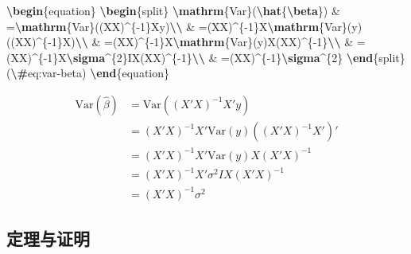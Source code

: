 \documentclass[
  12pt,
]{krantz}
\newenvironment{Shaded}{\begin{snugshade}}{\end{snugshade}}
\newcommand{\ExtensionTok}[1]{#1}
\newcommand{\KeywordTok}[1]{\textcolor[rgb]{0.13,0.29,0.53}{\textbf{#1}}}
\newcommand{\NormalTok}[1]{#1}
\newcommand{\SpecialCharTok}[1]{\textcolor[rgb]{0.81,0.36,0.00}{\textbf{#1}}}
\newcommand{\SpecialStringTok}[1]{\textcolor[rgb]{0.31,0.60,0.02}{#1}}
\theoremstyle{definition}
\theoremstyle{definition}
\theoremstyle{definition}
\theoremstyle{definition}
\theoremstyle{remark}
\begin{document}
\begin{Shaded}
\begin{Highlighting}[]
\KeywordTok{\textbackslash{}begin}\NormalTok{\{}\ExtensionTok{equation}\NormalTok{\}}\SpecialStringTok{ }
\KeywordTok{\textbackslash{}begin}\NormalTok{\{}\ExtensionTok{split}\NormalTok{\}}
\SpecialCharTok{\textbackslash{}mathrm}\SpecialStringTok{\{Var\}(}\SpecialCharTok{\textbackslash{}hat}\SpecialStringTok{\{}\SpecialCharTok{\textbackslash{}beta}\SpecialStringTok{\}) \& =}\SpecialCharTok{\textbackslash{}mathrm}\SpecialStringTok{\{Var\}((X\textquotesingle{}X)\^{}\{{-}1\}X\textquotesingle{}y)}\SpecialCharTok{\textbackslash{}\textbackslash{}}
\SpecialStringTok{ \& =(X\textquotesingle{}X)\^{}\{{-}1\}X\textquotesingle{}}\SpecialCharTok{\textbackslash{}mathrm}\SpecialStringTok{\{Var\}(y)((X\textquotesingle{}X)\^{}\{{-}1\}X\textquotesingle{})\textquotesingle{}}\SpecialCharTok{\textbackslash{}\textbackslash{}}
\SpecialStringTok{ \& =(X\textquotesingle{}X)\^{}\{{-}1\}X\textquotesingle{}}\SpecialCharTok{\textbackslash{}mathrm}\SpecialStringTok{\{Var\}(y)X(X\textquotesingle{}X)\^{}\{{-}1\}}\SpecialCharTok{\textbackslash{}\textbackslash{}}
\SpecialStringTok{ \& =(X\textquotesingle{}X)\^{}\{{-}1\}X\textquotesingle{}}\SpecialCharTok{\textbackslash{}sigma}\SpecialStringTok{\^{}\{2\}IX(X\textquotesingle{}X)\^{}\{{-}1\}}\SpecialCharTok{\textbackslash{}\textbackslash{}}
\SpecialStringTok{ \& =(X\textquotesingle{}X)\^{}\{{-}1\}}\SpecialCharTok{\textbackslash{}sigma}\SpecialStringTok{\^{}\{2\}}
\KeywordTok{\textbackslash{}end}\NormalTok{\{}\ExtensionTok{split}\NormalTok{\}}
\SpecialStringTok{(}\SpecialCharTok{\textbackslash{}\#}\SpecialStringTok{eq:var{-}beta)}
\KeywordTok{\textbackslash{}end}\NormalTok{\{}\ExtensionTok{equation}\NormalTok{\} }
\end{Highlighting}
\end{Shaded}

\begin{equation}
\begin{split}
\mathrm{Var}(\hat{\beta}) & =\mathrm{Var}((X'X)^{-1}X'y)\\
 & =(X'X)^{-1}X'\mathrm{Var}(y)((X'X)^{-1}X')'\\
 & =(X'X)^{-1}X'\mathrm{Var}(y)X(X'X)^{-1}\\
 & =(X'X)^{-1}X'\sigma^{2}IX(X'X)^{-1}\\
 & =(X'X)^{-1}\sigma^{2}
\end{split}
\label{eq:var-beta}
\end{equation}

\subsection{定理与证明}\label{theorems}
\end{document}
